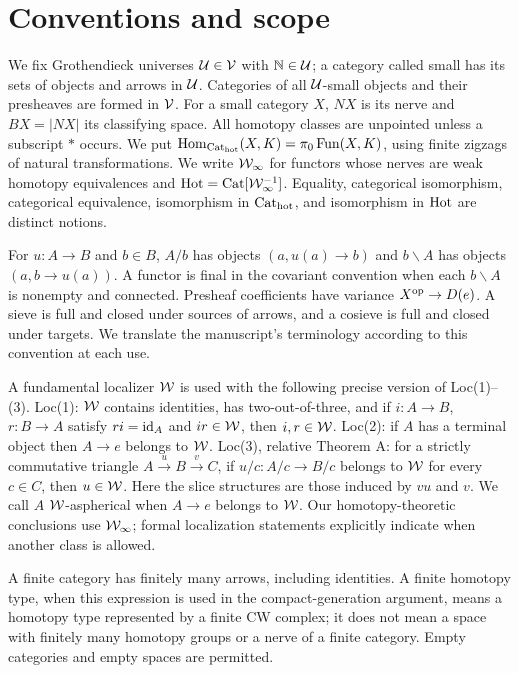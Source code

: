 \section*{Conventions and scope}
We fix Grothendieck universes $\mathcal U\in\mathcal V$ with $\mathbb N\in\mathcal U$; a category called small has its sets of objects and arrows in $\mathcal U$. Categories of all $\mathcal U$-small objects and their presheaves are formed in $\mathcal V$. For a small category $X$, $NX$ is its nerve and $BX=|NX|$ its classifying space. All homotopy classes are unpointed unless a subscript $*$ occurs. We put $\operatorname{Hom}_{{\mathrm{Cat}_{\mathrm{hot}}}}(X,K)=\pi_0\operatorname{Fun}(X,K)$, using finite zigzags of natural transformations. We write $\mathcal W_\infty$ for functors whose nerves are weak homotopy equivalences and $\mathrm{Hot}=\mathrm{Cat}[\mathcal W_\infty^{-1}]$. Equality, categorical isomorphism, categorical equivalence, isomorphism in ${\mathrm{Cat}_{\mathrm{hot}}}$, and isomorphism in $\mathrm{Hot}$ are distinct notions.

For $u:A\to B$ and $b\in B$, $A/b$ has objects $(a,u(a)\to b)$ and $b\backslash A$ has objects $(a,b\to u(a))$. A functor is final in the covariant convention when each $b\backslash A$ is nonempty and connected. Presheaf coefficients have variance $X^{\mathrm{op}}\to D(e)$. A sieve is full and closed under sources of arrows, and a cosieve is full and closed under targets. We translate the manuscript's terminology according to this convention at each use.

A fundamental localizer $\mathcal W$ is used with the following precise version of Loc(1)--(3). Loc(1): $\mathcal W$ contains identities, has two-out-of-three, and if $i:A\to B$, $r:B\to A$ satisfy $ri=\mathrm{id}_A$ and $ir\in\mathcal W$, then $i,r\in\mathcal W$. Loc(2): if $A$ has a terminal object then $A\to e$ belongs to $\mathcal W$. Loc(3), relative Theorem A: for a strictly commutative triangle $A\xrightarrow{u}B\xrightarrow{v}C$, if $u/c:A/c\to B/c$ belongs to $\mathcal W$ for every $c\in C$, then $u\in\mathcal W$. Here the slice structures are those induced by $vu$ and $v$. We call $A$ $\mathcal W$-aspherical when $A\to e$ belongs to $\mathcal W$. Our homotopy-theoretic conclusions use $\mathcal W_\infty$; formal localization statements explicitly indicate when another class is allowed.

A finite category has finitely many arrows, including identities. A finite homotopy type, when this expression is used in the compact-generation argument, means a homotopy type represented by a finite CW complex; it does not mean a space with finitely many homotopy groups or a nerve of a finite category. Empty categories and empty spaces are permitted.
